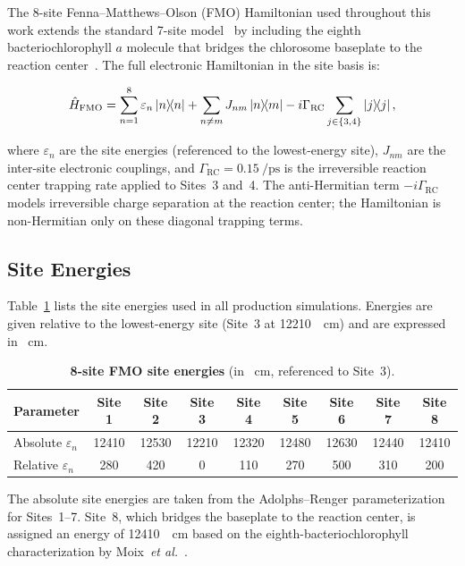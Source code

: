 \documentclass[11pt,a4paper]{article}
\begin{document}
The 8-site Fenna--Matthews--Olson (FMO) Hamiltonian used throughout this work extends the standard 7-site model~\cite{Adolphs2006} by including the eighth bacteriochlorophyll $a$ molecule that bridges the chlorosome baseplate to the reaction center~\cite{Moix2011}.
The full electronic Hamiltonian in the site basis is:

\begin{equation}
\hat{H}_{\mathrm{FMO}} = \sum_{n=1}^{8} \varepsilon_n \dyad{n} + \sum_{n \neq m} J_{nm} \dyad{n}{m} - i\Gamma_{\mathrm{RC}} \sum_{j \in \{3,4\}} \dyad{j}{j},
\label{eq:SI_fmo_hamiltonian}
\end{equation}

where $\varepsilon_n$ are the site energies (referenced to the lowest-energy site), $J_{nm}$ are the inter-site electronic couplings, and $\Gamma_{\mathrm{RC}} = \SI{0.15}{\per\ps}$ is the irreversible reaction center trapping rate applied to Sites~3 and~4.
The anti-Hermitian term $-i\Gamma_{\mathrm{RC}}$ models irreversible charge separation at the reaction center; the Hamiltonian is non-Hermitian only on these diagonal trapping terms.

\subsection{Site Energies}

Table~\ref{tab:SI_site_energies} lists the site energies used in all production simulations.
Energies are given relative to the lowest-energy site (Site~3 at \SI{12210}{\per\cm}) and are expressed in \si{\per\cm}.

\begin{table}[htbp]
\centering
\caption{\textbf{8-site FMO site energies} (in \si{\per\cm}, referenced to Site~3).}
\label{tab:SI_site_energies}
\begin{tabular}{lcccccccc}
\toprule
\textbf{Parameter} & \textbf{Site 1} & \textbf{Site 2} & \textbf{Site 3} & \textbf{Site 4} & \textbf{Site 5} & \textbf{Site 6} & \textbf{Site 7} & \textbf{Site 8} \\
\midrule
Absolute $\varepsilon_n$ & 12410 & 12530 & 12210 & 12320 & 12480 & 12630 & 12440 & 12410 \\
Relative $\varepsilon_n$ & 280   & 420   & 0     & 110   & 270   & 500   & 310   & 200   \\
\bottomrule
\end{tabular}
\end{table}

The absolute site energies are taken from the Adolphs--Renger parameterization~\cite{Adolphs2006} for Sites~1--7.
Site~8, which bridges the baseplate to the reaction center, is assigned an energy of \SI{12410}{\per\cm} based on the eighth-bacteriochlorophyll characterization by Moix~\textit{et al.}~\cite{Moix2011}.
\end{document}
